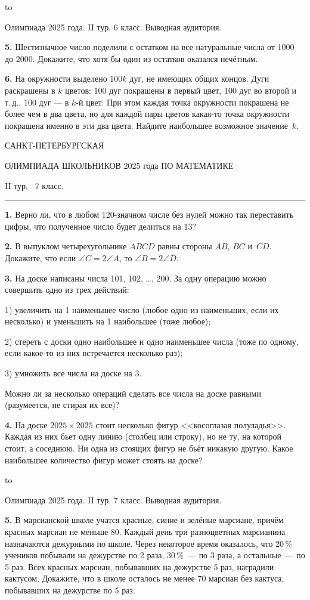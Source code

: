 \documentclass[12pt]{article}
\def\q#1.{{\bf #1. }}
\def\dotline{\smallskip\hbox to \hsize{\dotfill}\medskip}
\begin{document}
\dotline

\centerline{Олимпиада 2025 года. II тур. 6 класс. Выводная аудитория.}
\smallskip

\q5. Шестизначное число поделили с остатком на все натуральные числа от 1000 до 2000. Докажите, что хотя бы один из остатков оказался нечётным.

\q6. На окружности выделено $100k$ дуг, не имеющих общих концов. Дуги раскрашены в $k$ цветов: 100 дуг покрашены в первый цвет, 100 дуг во второй и т.\,д., 100 дуг --- в $k$-й цвет. При этом каждая точка окружности покрашена не более чем в два цвета, но для каждой пары цветов какая-то точка окружности покрашена именно в эти два цвета. Найдите наибольшее возможное значение~$k$.


\clearpage

\centerline{\sc САНКТ-ПЕТЕРБУРГСКАЯ}
\centerline{\sc ОЛИМПИАДА ШКОЛЬНИКОВ 2025 года ПО МАТЕМАТИКЕ}
\centerline{\sc II тур. \ 7 класс.}
\medskip
\hrule
\medskip

\q1. Верно ли, что в любом 120-значном числе без нулей можно так переставить цифры, что полученное число будет делиться на 13?

\q2. В выпуклом четырехугольнике $ABCD$ равны стороны $AB$, $BC$ и~$CD$. Докажите, что если $\angle C = 2\angle A$, то $\angle B = 2\angle D$.

\q3. На доске написаны числа 101, 102, \dots, 200. За одну операцию можно совершить одно из трех действий:

1) увеличить на 1 наименьшее число (любое одно из наименьших, если их
несколько) и уменьшить на 1 наибольшее (тоже любое);

2) стереть с доски одно наибольшее и одно наименьшее числа (тоже по одному, если
какое-то из них встречается несколько раз);

3) умножить все числа на доске на 3.

\noindent
Можно ли за несколько операций сделать все числа на доске равными (разумеется, не стирая их все)?

\q4. На доске $2025\times 2025$ стоит несколько фигур <<косоглазая полуладья>>. Каждая из них бьет одну линию (столбец или строку), но не ту, на которой стоит, а соседнюю. Ни одна из стоящих фигур не бьёт никакую другую. Какое наибольшее количество фигур может стоять на доске?

\dotline

\centerline{Олимпиада 2025 года. II тур. 7 класс. Выводная аудитория.}
\smallskip

\q5. В марсианской школе учатся красные, синие и зелёные марсиане, причём красных марсиан не меньше 80. Каждый день три разноцветных марсианина назначаются дежурными по школе. Через некоторое время оказалось, что 20\,\% учеников побывали на дежурстве по 2 раза, 30\,\%~--- по 3 раза, а остальные~--- по 5 раз. Всех красных марсиан, побывавших на дежурстве 5 раз, наградили кактусом. Докажите, что в школе осталось не менее 70 марсиан без кактуса, побывавших на дежурстве по 5 раз.
\end{document}
